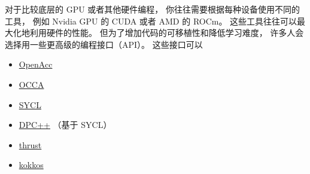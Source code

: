 
对于比较底层的 GPU 或者其他硬件编程， 你往往需要根据每种设备使用不同的工具， 例如 Nvidia GPU 的 CUDA 或者 AMD 的 ROCm。 这些工具往往可以最大化地利用硬件的性能。 但为了增加代码的可移植性和降低学习难度， 许多人会选择用一些更高级的编程接口（API）。 这些接口可以

\begin{itemize}
\item \href{https://www.openacc.org/}{OpenAcc}
\item \href{https://libocca.org/}{OCCA}
\item \href{https://www.khronos.org/api/index_2017/sycl}{SYCL}
\item \href{https://www.intel.com/content/www/us/en/developer/tools/oneapi/dpc-compiler.html#gs.5ytas2}{DPC++} （基于 SYCL）
\item \href{https://developer.nvidia.com/thrust}{thrust}
\item \href{https://kokkos.github.io/}{kokkos}
\end{itemize}
